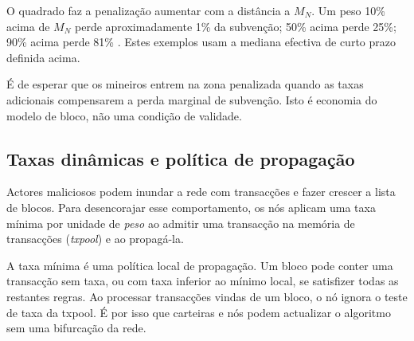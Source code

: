 O quadrado faz a penalização aumentar com a distância a $M_N$. Um peso 10\%
acima de $M_N$ perde aproximadamente 1\% da subvenção; 50\% acima perde 25\%;
90\% acima perde 81\% \cite{monero-coin-emission}. Estes exemplos usam a
mediana efectiva de curto prazo definida acima.


É de esperar que os mineiros entrem na zona penalizada quando as taxas
adicionais compensarem a perda marginal de subvenção. Isto é economia do
modelo de bloco, não uma condição de validade.



\subsection{Taxas dinâmicas e política de propagação}
\label{subsec:dynamic-minimum-fee}

%
Actores maliciosos podem inundar a rede com transacções e fazer crescer a
lista de blocos. Para desencorajar esse comportamento, os nós aplicam uma taxa
mínima por unidade de \emph{peso} ao admitir uma transacção na memória de
transacções ({\em txpool}) e ao propagá-la.


A taxa mínima é uma política local de propagação. Um bloco pode conter uma
transacção sem taxa, ou com taxa inferior ao mínimo local, se satisfizer todas
as restantes regras. Ao processar transacções vindas de um bloco, o nó ignora
o teste de taxa da txpool. É por isso que carteiras e nós podem actualizar o
algoritmo sem uma bifurcação da rede.

